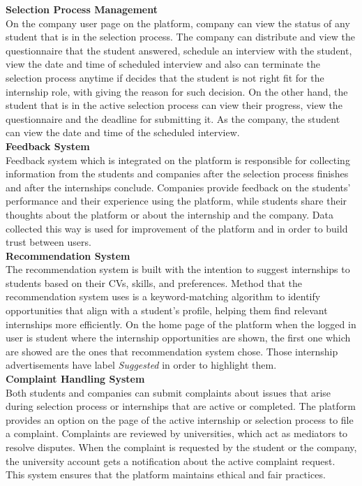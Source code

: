 \textbf{Selection Process Management} \\
On the company user page on the platform, company can view the status of any student that is in the selection process. The company can distribute and view the questionnaire that the student answered, schedule an interview with the student, view the date and time of scheduled interview and also can terminate the selection process anytime if decides that the student is not right fit for the internship role, with giving the reason for such decision. On the other hand, the student that is in the active selection process can view their progress, view the questionnaire and the deadline for submitting it. As the company, the student can view the date and time of the scheduled interview. \\

\textbf{Feedback System} \\
Feedback system which is integrated on the platform is responsible for collecting information from the students and companies after the selection process finishes and after the internships conclude. Companies provide feedback on the students’ performance and their experience using the platform, while students share their thoughts about the platform or about the internship and the company. Data collected this way is used for improvement of the platform and in order to build trust between users. \\

\textbf{Recommendation System} \\
The recommendation system is built with the intention to suggest internships to students based on their CVs, skills, and preferences. Method that the recommendation system uses is  a keyword-matching algorithm to identify opportunities that align with a student’s profile, helping them find relevant internships more efficiently. On the home page of the platform when the logged in user is student where the internship opportunities are shown, the first one which are showed are the ones that recommendation system chose. Those internship advertisements have label \textit{Suggested} in order to highlight them.\\

\textbf{Complaint Handling System} \\
Both students and companies can submit complaints about issues that arise during selection process or internships that are active or completed. The platform provides an option on the page of the active internship or selection process to file a complaint. Complaints are reviewed by universities, which act as mediators to resolve disputes. When the complaint is requested by the student or the company, the university account gets a notification about the active complaint request. This system ensures that the platform maintains ethical and fair practices. \\

